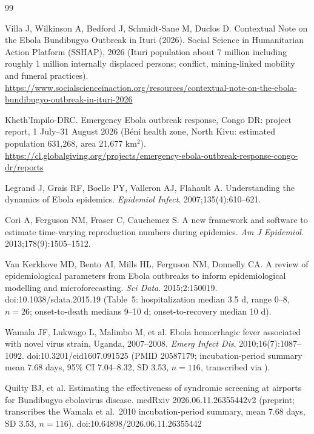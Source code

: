 \documentclass[preprint,12pt,numbers]{elsarticle}
\begin{document}
\begin{thebibliography}{99}

 Villa J, Wilkinson A, Bedford J, Schmidt-Sane M,
Duclos D. Contextual Note on the Ebola Bundibugyo Outbreak in Ituri
(2026). Social Science in Humanitarian Action Platform (SSHAP), 2026
(Ituri population about 7 million including roughly 1 million internally
displaced persons; conflict, mining-linked mobility and funeral
practices).
\url{https://www.socialscienceinaction.org/resources/contextual-note-on-the-ebola-bundibugyo-outbreak-in-ituri-2026}

 Kheth'Impilo-DRC. Emergency Ebola outbreak
response, Congo DR: project report, 1 July--31 August 2026 (B\'eni health
zone, North Kivu: estimated population 631{,}268, area 21{,}677
km$^2$).
\url{https://cl.globalgiving.org/projects/emergency-ebola-outbreak-response-congo-dr/reports}

 Legrand J, Grais RF, Boelle PY, Valleron AJ,
Flahault A. Understanding the dynamics of Ebola epidemics. \emph{Epidemiol
Infect}. 2007;135(4):610--621.

 Cori A, Ferguson NM, Fraser C, Cauchemez S. A new
framework and software to estimate time-varying reproduction numbers
during epidemics. \emph{Am J Epidemiol}. 2013;178(9):1505--1512.

 Van Kerkhove MD, Bento AI, Mills HL, Ferguson
NM, Donnelly CA. A review of epidemiological parameters from Ebola
outbreaks to inform epidemiological modelling and microforecasting.
\emph{Sci Data}. 2015;2:150019. doi:10.1038/sdata.2015.19 (Table~5:
hospitalization median 3.5 d, range 0--8, $n=26$; onset-to-death medians
9--10 d; onset-to-recovery median 10 d).

 Wamala JF, Lukwago L, Malimbo M, et al. Ebola
hemorrhagic fever associated with novel virus strain, Uganda,
2007--2008. \emph{Emerg Infect Dis}. 2010;16(7):1087--1092.
doi:10.3201/eid1607.091525 (PMID 20587179; incubation-period summary
mean 7.68 days, 95\% CI 7.04--8.32, SD 3.53, $n=116$, transcribed via
\cite{Quilty2026}).

 Quilty BJ, et al. Estimating the effectiveness of
syndromic screening at airports for Bundibugyo ebolavirus disease.
medRxiv 2026.06.11.26355442v2 (preprint; transcribes the Wamala et al.\
2010 incubation-period summary, mean 7.68 days, SD 3.53, $n=116$).
doi:10.64898/2026.06.11.26355442


\end{thebibliography}
\end{document}
